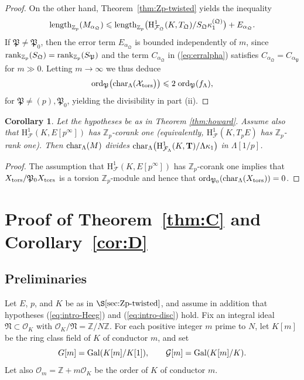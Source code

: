 \documentclass[10pt]{amsart}
\numberwithin{equation}{section}
\newtheorem{cor}[theorem]{Corollary}
\theoremstyle{definition}
\theoremstyle{remark}
\newcommand{\Z}{\mathbb{Z}}
\newcommand{\Fcal}{\mathcal{F}}
\newcommand{\cF}{\mathcal{F}}
\newcommand{\bZ}{\mathbb{Z}}
\newcommand{\rH}{\mathrm{H}}
\newcommand{\CF}{\mathcal{F}}
\begin{document}
\begin{proof}
On the other hand, 
Theorem~\ref{thm:Zp-twisted} yields the inequality
\[
{\rm length}_{\bZ_p}(M_{\alpha_\mathfrak{Q}})\leqslant{\rm length}_{\bZ_p}\bigl(\rH^1_{\cF_{\mathfrak{Q}}}(K,T_{\mathfrak{Q}})/S_{\mathfrak{Q}}\kappa_1^{(\mathfrak{Q})}\bigr)+E_{\alpha_\mathfrak{Q}}.
\]
If $\mathfrak{P} \neq \mathfrak{P}_0$, then 
the error term $E_{\alpha_\mathfrak{Q}}$ is bounded independently of $m$, since 
${\rm rank}_{\Z_p}(S_{\mathfrak{Q}})={\rm rank}_{\Z_p}(S_{\mathfrak{P}})$ and the term $C_{\alpha_\mathfrak{Q}}$ in (\ref{eq:erralpha}) satisfies $C_{\alpha_\mathfrak{Q}}=C_{\alpha_\mathfrak{P}}$ for $m\gg 0$. Letting $m\to\infty$ we thus deduce
\[
{\rm ord}_{\mathfrak{P}}\bigl({\rm char}_\Lambda(\mathcal{X}_{\rm tors}\bigr)\bigr)\leqslant 2\;{\rm ord}_{\mathfrak{P}}(f_\Lambda),
\]
for $\mathfrak{P}\neq (p), \mathfrak{P}_0$, yielding the divisibility in part (ii).
\end{proof}

\begin{cor}\label{cor:howard}
Let the hypotheses be as in Theorem \ref{thm:howard}. Assume also that $\rH^1_{\CF}(K,E[p^\infty])$ has $\Z_p$-corank one (equivalently, $\rH^1_{\CF}(K,T_pE)$ has $\Z_p$-rank one).  Then 
${\rm char}_\Lambda(M)$ divides ${\rm char}_\Lambda\bigl(\rH^1_{\Fcal_\Lambda}(K,\mathbf{T})/\Lambda\kappa_1\bigr)$ in $\Lambda[1/p]$.
\end{cor}

\begin{proof} The assumption that $\rH^1_{\CF}(K,E[p^\infty])$ has $\Z_p$-corank one implies that 
$X_{\rm tors}/\mathfrak{P}_0X_{\rm tors}$ is a torsion $\Z_p$-module and hence that ${\rm ord}_{\mathfrak{P}_0}({\rm char}_\Lambda(X_{\rm tors})) =0$.
\end{proof}

\section{Proof of Theorem~\ref{thm:C} and Corollary~\ref{cor:D}}
\label{sec:CD}

\subsection{Preliminaries}
\label{subsec:HPKS}

Let $E$, $p$, and $K$ be as in $\S\ref{sec:Zp-twisted}$, and assume in addition that hypotheses (\ref{eq:intro-Heeg}) and (\ref{eq:intro-disc}) hold. Fix an integral ideal $\mathfrak{N}\subset\mathcal{O}_K$ with $\mathcal{O}_K/\mathfrak{N}=\Z/N\Z$. For each positive integer $m$ prime to $N$, let $K[m]$ be the ring class field of $K$ of conductor $m$, and set
\[
G[m]={\rm Gal}(K[m]/K[1]),\quad\quad\mathcal{G}[m]={\rm Gal}(K[m]/K).
\]
Let also $\mathcal{O}_m=\Z+m\mathcal{O}_K$ be the order of $K$ of conductor $m$.
\end{document}
